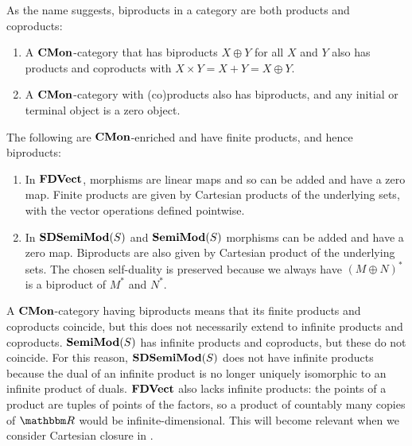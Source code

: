 As the name suggests, biproducts in a category are both products and
coproducts:
\begin{proposition}
  \item
  \begin{enumerate}[leftmargin=\enummargin]
  \item A $\mathbf{CMon}$-category that has biproducts $X \oplus Y$ for all
    $X$ and $Y$ also has products and coproducts with
    $X \times Y = X + Y = X \oplus Y$.
  \item A $\mathbf{CMon}$-category with (co)products also has biproducts, and
    any initial or terminal object is a zero object.
  \end{enumerate}
\end{proposition}

\begin{example}
  The following are $\mathbf{CMon}$-enriched and have finite products, and
  hence biproducts:
  \begin{enumerate}[leftmargin=\enummargin]
  \item In $\mathbf{FDVect}$, morphisms are linear maps and so can be added
    and have a zero map. Finite products are given by Cartesian
    products of the underlying sets, with the vector operations
    defined pointwise.
  \item In $\mathbf{SDSemiMod}(S)$ and $\mathbf{SemiMod}(S)$ morphisms can be added
    and have a zero map. Biproducts are also given by Cartesian
    product of the underlying sets. The chosen self-duality is
    preserved because we always have $(M \oplus N)^*$ is a biproduct
    of $M^*$ and $N^*$.

  \end{enumerate}
\end{example}

\begin{remark}
  A $\mathbf{CMon}$-category having biproducts means that its finite products and coproducts coincide, but this does
  not necessarily extend to infinite products and coproducts. $\mathbf{SemiMod}(S)$ has infinite products and
  coproducts, but these do not coincide. For this reason, $\mathbf{SDSemiMod}(S)$ does not have infinite products
  because the dual of an infinite product is no longer uniquely isomorphic to an infinite product of duals.
  $\mathbf{FDVect}$ also lacks infinite products: the points of a product are tuples of points of the factors,
  so a product of countably many copies of $\RR$ would be infinite-dimensional. This will become
  relevant when we consider Cartesian closure in .
\end{remark}

